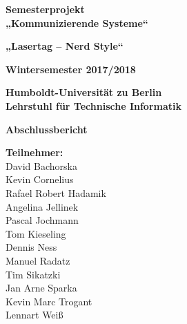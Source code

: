 \documentclass[a4paper, 11pt]{article}
\begin{document}
\sloppy

\pagestyle{fancy}
\fancyhf{}
\renewcommand\headrulewidth{0pt}

\begin{center}
  \noindent \textbf{\LARGE \center Semesterprojekt \\ „Kommunizierende Systeme“}
  
  \vspace{0.3cm}
  
  \noindent \textbf{\LARGE \center „Lasertag – Nerd Style“}
  
  \vspace{1cm}
  
  \noindent \textbf{\large Wintersemester 2017/2018}
  
  \vspace{0.5cm}
  
  \noindent \textbf{\large Humboldt-Universität zu Berlin \\ Lehrstuhl für Technische Informatik}
  
  \vspace{1cm}
  
  \noindent \textbf{\LARGE Abschlussbericht}
  
  \vspace{2cm}
  \noindent
  \textbf{\large Teilnehmer:} \\
  David Bachorska \\
  Kevin Cornelius \\
  Rafael Robert Hadamik \\
  Angelina Jellinek \\
  Pascal Jochmann \\
  Tom Kieseling \\
  Dennis Ness \\
  Manuel Radatz \\
  Tim Sikatzki \\
  Jan Arne Sparka \\
  Kevin Marc Trogant \\
  Lennart Weiß
\end{center}

\pagebreak


\tableofcontents
\pagebreak










\end{document}
